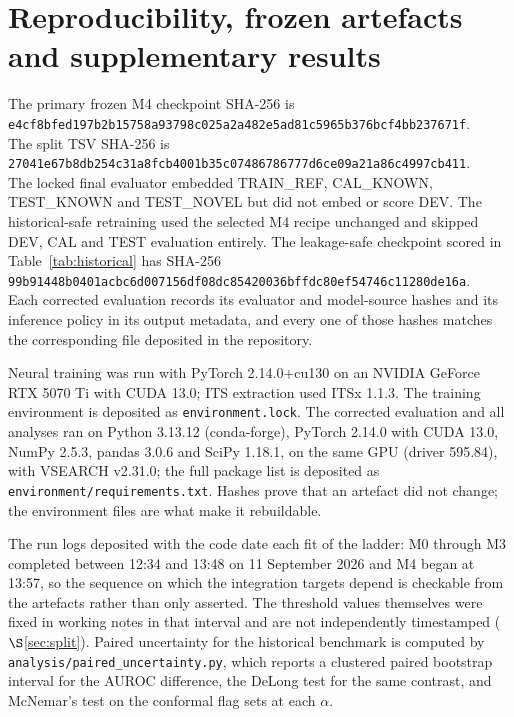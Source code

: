 \documentclass[11pt]{article}
\begin{document}
\section{Reproducibility, frozen artefacts and supplementary results}
\label{app:repro}
The primary frozen M4 checkpoint SHA-256 is\\
\nolinkurl{e4cf8bfed197b2b15758a93798c025a2a482e5ad81c5965b376bcf4bb237671f}.\\
The split TSV SHA-256 is\\
\nolinkurl{27041e67b8db254c31a8fcb4001b35c07486786777d6ce09a21a86c4997cb411}.\\
The locked final evaluator embedded TRAIN\_REF, CAL\_KNOWN, TEST\_KNOWN and
TEST\_NOVEL but did not embed or score DEV. The historical-safe retraining used
the selected M4 recipe unchanged and skipped DEV, CAL and TEST evaluation
entirely. The leakage-safe checkpoint scored in Table~\ref{tab:historical} has
SHA-256\\
\nolinkurl{99b91448b0401acbc6d007156df08dc85420036bffdc80ef54746c11280de16a}.\\
Each corrected evaluation records its evaluator and model-source hashes and its
inference policy in its output metadata, and every one of those hashes matches
the corresponding file deposited in the repository.

Neural training was run with PyTorch 2.14.0+cu130 on an NVIDIA GeForce RTX 5070
Ti with CUDA 13.0; ITS extraction used ITSx 1.1.3. The training environment is
deposited as \texttt{environment.lock}. The corrected evaluation and all
analyses ran on Python 3.13.12 (conda-forge), PyTorch 2.14.0 with CUDA 13.0,
NumPy 2.5.3, pandas 3.0.6 and SciPy 1.18.1, on the same GPU (driver 595.84), with
VSEARCH v2.31.0; the full package list is deposited as
\texttt{environment/requirements.txt}. Hashes prove that an artefact did not
change; the environment files are what make it rebuildable.

The run logs deposited with the code date each fit of the ladder: M0 through M3
completed between 12:34 and 13:48 on 11 September 2026 and M4 began at 13:57, so
the sequence on which the integration targets depend is checkable from the
artefacts rather than only asserted. The threshold values themselves were fixed
in working notes in that interval and are not independently timestamped
($\S$\ref{sec:split}).
Paired uncertainty for the historical benchmark is computed by
\texttt{analysis/paired\_uncertainty.py}, which reports a clustered paired
bootstrap interval for the AUROC difference, the DeLong test for the same
contrast, and McNemar's test on the conformal flag sets at each $\alpha$.
\end{document}
